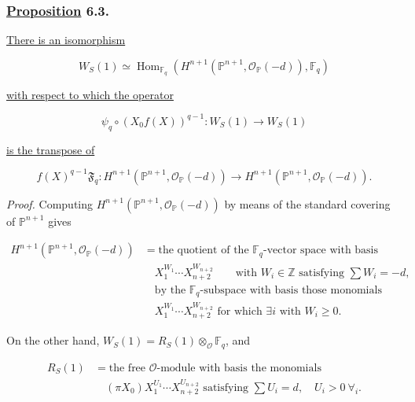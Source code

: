 \subsubsection*{\underline{Proposition} 6.3.}
\underline{There is an isomorphism}

\begin{equation}\tag{6.3.1}
W_S(1)\simeq
\operatorname{Hom}_{\mathbb F_q}\!\left(
H^{n+1}(\mathbb P^{n+1},\mathcal O_{\mathbb P}(-d)),
\mathbb F_q\right)
\end{equation}

\underline{with respect to which the operator}

\begin{equation}\tag{6.3.2}
\psi_q\circ(X_0f(X))^{q-1}:W_S(1)\longrightarrow W_S(1)
\end{equation}

\underline{is the transpose of}

\begin{equation}\tag{6.3.3}
f(X)^{q-1}\mathfrak F_q:
H^{n+1}(\mathbb P^{n+1},\mathcal O_{\mathbb P}(-d))
\longrightarrow
H^{n+1}(\mathbb P^{n+1},\mathcal O_{\mathbb P}(-d)).
\end{equation}

\noindent\emph{Proof.}
Computing
$H^{n+1}(\mathbb P^{n+1},\mathcal O_{\mathbb P}(-d))$
by means of the standard covering of $\mathbb P^{n+1}$ gives

\begin{equation}\tag{6.3.4}
\begin{aligned}
H^{n+1}(\mathbb P^{n+1},\mathcal O_{\mathbb P}(-d))
&=\text{the quotient of the $\mathbb F_q$-vector space with basis}\\
&\quad X_1^{W_1}\cdots X_{n+2}^{W_{n+2}}
\qquad\text{with }W_i\in\mathbb Z\text{ satisfying }\sum W_i=-d,\\
&\quad\text{by the $\mathbb F_q$-subspace with basis those monomials}\\
&\quad X_1^{W_1}\cdots X_{n+2}^{W_{n+2}}
\text{ for which }\exists i\text{ with }W_i\geq0.
\end{aligned}
\end{equation}

On the other hand, $W_S(1)=R_S(1)\otimes_{\mathcal O}\mathbb F_q$, and

\begin{equation}\tag{6.3.5}
\begin{aligned}
R_S(1)
&=\text{the free $\mathcal O$-module with basis the monomials}\\
&\quad
(\pi X_0)X_1^{U_1}\cdots X_{n+2}^{U_{n+2}}
\text{ satisfying }
\sum U_i=d,\quad U_i>0\ \forall_i.
\end{aligned}
\end{equation}

